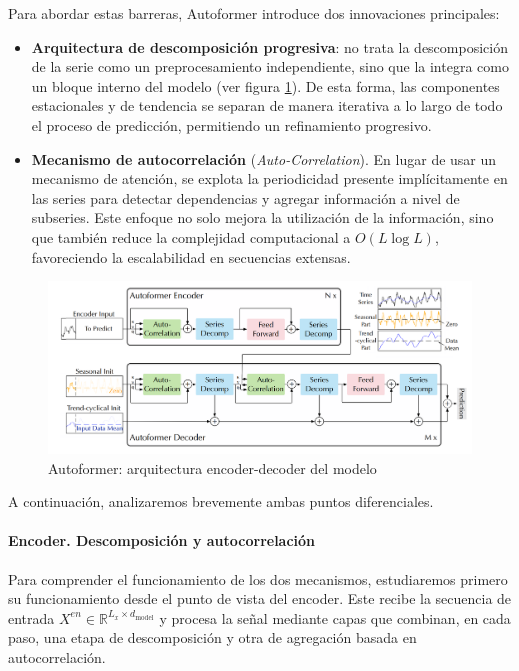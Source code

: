 Para abordar estas barreras, Autoformer introduce dos innovaciones principales:
\begin{itemize}
    \item \textbf{Arquitectura de descomposición progresiva}: no trata la descomposición de la serie como un preprocesamiento independiente, sino que la integra como un bloque interno del modelo (ver figura \ref{autformer}). De esta forma, las componentes estacionales y de tendencia se separan de manera iterativa a lo largo de todo el proceso de predicción, permitiendo un refinamiento progresivo.
    \item \textbf{Mecanismo de autocorrelación} (\textit{Auto-Correlation}). En lugar de usar un mecanismo de atención, se explota la periodicidad presente implícitamente en las series para detectar dependencias y agregar información a nivel de subseries. Este enfoque no solo mejora la utilización de la información, sino que también reduce la complejidad computacional a $O(L \log L)$, favoreciendo la escalabilidad en secuencias extensas.
\end{itemize}

\begin{figure}[!ht]
    \centering
    \includegraphics[scale=0.2]{img/autoformer.png}
    \caption{Autoformer: arquitectura encoder-decoder del modelo~\cite{wu2022autoformerdecompositiontransformersautocorrelation}}
    \label{autformer}
\end{figure}

A continuación, analizaremos brevemente ambas puntos diferenciales.

\paragraph{Encoder. Descomposición y autocorrelación}
Para comprender el funcionamiento de los dos mecanismos, estudiaremos primero su funcionamiento desde el punto de vista del encoder. Este recibe la secuencia de entrada \(X^{en} \in \mathbb{R}^{L_x \times d_{\text{model}}}\) y procesa la señal mediante capas que combinan, en cada paso, una etapa de descomposición y otra de agregación basada en autocorrelación. \\

